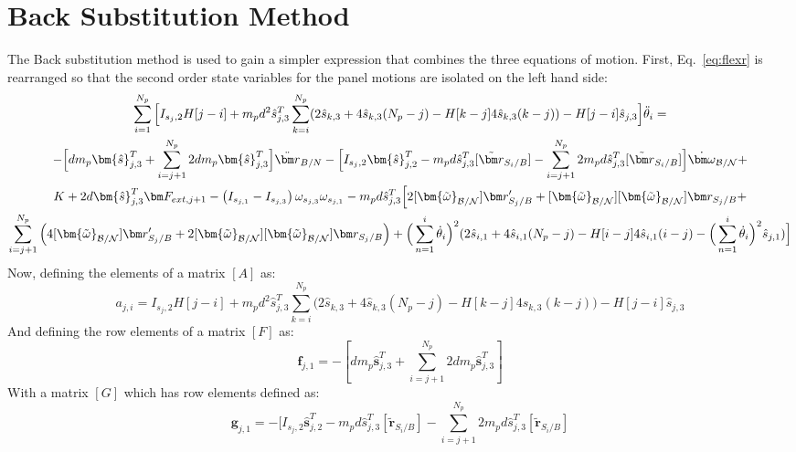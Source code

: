 \documentclass[paper]{aiaaNew}
\begin{document}
\section{Back Substitution Method}
The Back substitution method is used to gain a simpler expression that combines the three equations of motion. First, Eq.~\eqref{eq:flexr} is rearranged so that the second order state variables for the panel motions are isolated on the left hand side:
\begin{multline}
\sum^{N_p}_{i=1}\Big[I_{s_j,2} H[j-i] + m_p d^2 \hat{s}^{T}_{j,3} \sum^{N_p}_{k=i}(2\hat{s}_{k,3}+4\hat{s}_{k,3}(N_p-j) -H[k-j] 4\hat{s}_{k,3}(k-j)) - H[j-i]\hat{s}_{j,3} \Big] \ddot{\theta}_i = \\
 - \Big[d m_p\bm{\hat{s}}^{T}_{j,3}+\sum^{N_p}_{i=j+1}2 d m_p\bm{\hat{s}}^{T}_{j,3}\Big]\ddot{\bm r}_{B/N} - \Big[I_{s_j,2} \bm{\hat{s}}_{j,2}^T -m_p d \hat{s}^{T}_{j,3}[\tilde{{\bm r}}_{S_{i}/B}]-\sum^{N_p}_{i=j+1} 2 m_p d \hat{s}^{T}_{j,3}[\tilde{{\bm r}}_{S_{i}/B}]\Big]\dot{\bm\omega}_{\cal B/N} +\\
 K + 2d\bm{\hat{s}}^{T}_{j,3}\bm F_{ext,j+1} - \left( I_{s_{j,1}} - I_{s_{j,3}}\right) \omega_{s_{j,3}} \omega_{s_{j,1}} - m_p d \hat{s}^{T}_{j,3}\Big[2[\bm{\tilde{\omega}}_{\cal B/N}]\bm r'_{S_{j}/B} + [\bm{\tilde{\omega}}_{\cal B/N}][\bm{\tilde{\omega}}_{\cal B/N}]\bm r_{S_{j}/B}+\\
\sum^{N_p}_{i=j+1}\Big(4[\bm{\tilde{\omega}}_{\cal B/N}]\bm r'_{S_{j}/B} + 2[\bm{\tilde{\omega}}_{\cal B/N}][\bm{\tilde{\omega}}_{\cal B/N}]\bm r_{S_{j}/B} \Big) + \Big( \sum^{i}_{n=1} \dot{\theta}_i \Big)^2 (2\hat{s}_{i,1}+4\hat{s}_{i,1}(N_p-j) -H[i-j] 4\hat{s}_{i,1}(i-j) - \Big( \sum^{i}_{n=1} \dot{\theta}_i\Big)^2 \hat{s}_{j,1} )\Big]
\label{eq:spMotion1}
\end{multline}
Now, defining the elements of a matrix $[A]$ as:
\begin{equation}
	a_{j,i} = I_{s_j,2} H[j-i] + m_p d^2 \hat{s}^{T}_{j,3} \sum^{N_p}_{k=i}\Big(2\hat{s}_{k,3}+4\hat{s}_{k,3}(N_p-j) -H[k-j] 4\hat{s}_{k,3}(k-j)\Big) - H[j-i]\hat{s}_{j,3}
\end{equation}
And defining the row elements of a matrix $[F]$ as:
\begin{equation}
	\bm f_{j,1} =  - [d m_p \bm{\hat{s}}^{T}_{j,3}+\sum^{N_p}_{i=j+1}2 d m_p\bm{\hat{s}}^{T}_{j,3}]
\end{equation}
With a matrix $[G]$ which has row elements defined as:
\begin{equation}
	\bm g_{j,1} =  -[I_{s_j,2} \bm{\hat{s}}_{j,2}^T -m_p d \hat{s}^{T}_{j,3}[\tilde{{\bm r}}_{S_{i}/B}]-\sum^{N_p}_{i=j+1} 2 m_p d \hat{s}^{T}_{j,3}[\tilde{{\bm r}}_{S_{i}/B}]
\end{equation}
\end{document}
